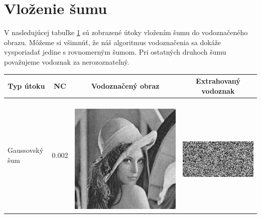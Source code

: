\section{Vloženie šumu} \label{noise}
V nasledujúcej tabuľke \ref{noise-table} sú zobrazené útoky vložením šumu do vodoznačeného obrazu. Môžeme si všimnúť, že náš algoritmus vodoznačenia sa dokáže vysporiadať jedine s rovnomerným šumom. Pri ostatných druhoch šumu považujeme vodoznak za nerozoznateľný.
\begin{table}[h]
\centering
\label{noise-table}
\begin{tabular}{llcc}
\hline
\multicolumn{1}{c}{\textbf{Typ útoku}} & \multicolumn{1}{c}{\textbf{NC}} & \multicolumn{1}{c}{\textbf{Vodoznačený obraz}} & \multicolumn{1}{c}{\textbf{Extrahovaný vodoznak}} \\ \hline
Gaussovský šum                         & 0.002 & 
\begin{minipage}[c]{.1\textwidth}
\ 
  \includegraphics[scale=0.1]{obrazky/GaussianNoise}
\end{minipage} & 
\begin{minipage}[c]{.15\textwidth}
\ 
  \includegraphics[scale=0.25]{obrazky/GaussianNoise-wm}

\end{minipage}
\end{tabular}
\end{table}
